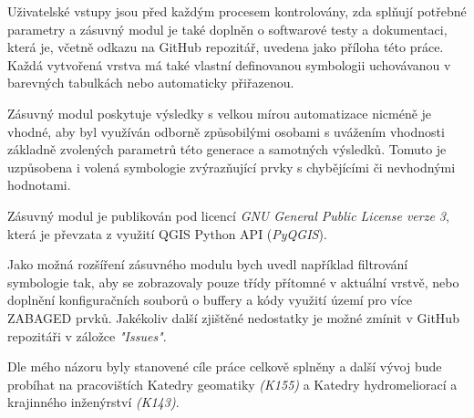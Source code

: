 \documentclass[a4paper,oneside,12pt]{book}
\begin{document}
\hspace{10mm} Uživatelské vstupy jsou před každým procesem kontrolovány, zda splňují potřebné parametry a zásuvný modul je také doplněn o softwarové testy a dokumentaci, která je, včetně odkazu na GitHub repozitář, uvedena jako příloha této práce. Každá vytvořená vrstva má také vlastní definovanou symbologii uchovávanou v barevných tabulkách nebo automaticky přiřazenou.

\hspace{10mm} Zásuvný modul poskytuje výsledky s velkou mírou automatizace nicméně je vhodné, aby byl využíván odborně způsobilými osobami s uvážením vhodnosti základně zvolených parametrů této generace a samotných výsledků. Tomuto je uzpůsobena i volená symbologie zvýrazňující prvky s chybějícími či nevhodnými hodnotami.

\hspace{10mm} Zásuvný modul je publikován pod licencí \textit{GNU General Public License verze 3}, která je převzata z využití QGIS Python API (\textit{PyQGIS}).

\hspace{10mm} Jako možná rozšíření zásuvného modulu bych uvedl například filtrování symbologie tak, aby se zobrazovaly pouze třídy přítomné v aktuální vrstvě, nebo doplnění konfiguračních souborů o buffery a kódy využití území pro více ZABAGED prvků. Jakékoliv další zjištěné nedostatky je možné zmínit v GitHub repozitáři v záložce \textit{"Issues"}.

\hspace{10mm} Dle mého názoru byly stanovené cíle práce celkově splněny a další vývoj bude probíhat na pracovištích Katedry geomatiky \textit{(K155)} a Katedry hydromeliorací a krajinného inženýrství \textit{(K143)}.


\clearpage  %
  \label{zdroje}
\end{document}
